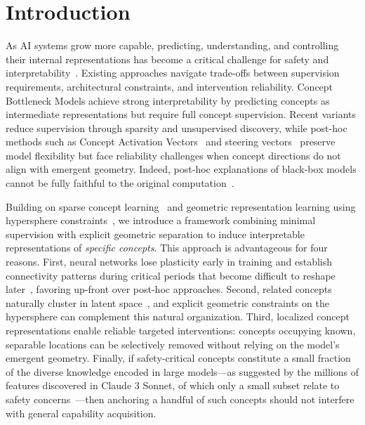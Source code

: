 \section{Introduction}
\label{sec:introduction}

As AI systems grow more capable, predicting, understanding, and controlling their internal representations has become a critical challenge for safety and interpretability~\citep{BereskaG24}. Existing approaches navigate trade-offs between supervision requirements, architectural constraints, and intervention reliability. Concept Bottleneck Models achieve strong interpretability by predicting concepts as intermediate representations but require full concept supervision. Recent variants reduce supervision through sparsity and unsupervised discovery, while post-hoc methods such as Concept Activation Vectors~\citep{KimWGCWVS18} and steering vectors~\citep{RimskyGSTHT24} preserve model flexibility but face reliability challenges when concept directions do not align with emergent geometry. Indeed, post-hoc explanations of black-box models cannot be fully faithful to the original computation~\citep{rudin2019stopexplainingblackbox}.

Building on sparse concept learning~\citep{semenov2024sparseconceptbottleneckmodels, Sawada2022ConceptBM, oikarinen2023labelfreeconceptbottleneckmodels, yamaguchi2025zeroshotconceptbottleneckmodels} and geometric representation learning using hypersphere constraints~\citep{wang2022understandingcontrastiverepresentationlearning,loshchilov2025ngptnormalizedtransformerrepresentation}, we introduce a framework combining minimal supervision with explicit geometric separation to induce interpretable representations of \textit{specific concepts}. This approach is advantageous for four reasons.
%
First, neural networks lose plasticity early in training and establish connectivity patterns during critical periods that become difficult to reshape later~\citep{AchilleRS17}, favoring up-front over post-hoc approaches.
%
Second, related concepts naturally cluster in latent space~\citep{Bengio2013,Mikolov2013,Pennington2014}, and explicit geometric constraints on the hypersphere can complement this natural organization.
%
Third, localized concept representations enable reliable targeted interventions: concepts occupying known, separable locations can be selectively removed without relying on the model's emergent geometry.
%
Finally, if safety-critical concepts constitute a small fraction of the diverse knowledge encoded in large models---as suggested by the millions of features discovered in Claude 3 Sonnet, of which only a small subset relate to safety concerns~\citep{templeton2024scaling}---then anchoring a handful of such concepts should not interfere with general capability acquisition.

